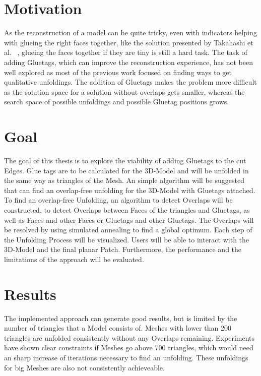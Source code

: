\documentclass[draft,final]{vutinfth} %
\begin{document}
\section{Motivation}
As the reconstruction of a model can be quite tricky, even with indicators helping with glueing the right faces together, like the solution presented by Takahashi et al.
~\cite{takahashi2011optimized}, glueing the faces together if they are tiny is still a hard task.
The task of adding Gluetags, which can improve the reconstruction experience, has not been well explored as most of the previous work focused on finding ways to get qualitative unfoldings. The addition of Gluetags makes the problem more difficult as the solution space for a solution without overlaps gets smaller, whereas the search space of possible unfoldings and possible Gluetag positions grows.

\section{Goal}
The goal of this thesis is to explore the viability of adding Gluetags to the cut Edges. Glue tags are to be calculated for the 3D-Model and will be unfolded in the same way as triangles of the Mesh. An simple algorithm will be suggested that can find an overlap-free unfolding for the 3D-Model with Gluetags attached. To find an overlap-free Unfolding, an algorithm to detect Overlaps will be constructed, to detect Overlaps between Faces of the triangles and Gluetags, as well as Faces and other Faces or Gluetags and other Gluetags.
The Overlaps will be resolved by using simulated annealing to find a global optimum. Each step of the Unfolding Process will be visualized. Users will be able to interact with the 3D-Model and the final planar Patch. Furthermore, the performance and the limitations of the approach will be evaluated.

\section{Results}
The implemented approach can generate good results, but is limited by the number of triangles that a Model consists of. Meshes with lower than 200 triangles are unfolded consistently without any Overlaps remaining. Experiments have shown clear constraints if Meshes go above 700 triangles, which would need an sharp increase of iterations necessary to find an unfolding. These unfoldings for big Meshes are also not consistently achieveable.
\end{document}
